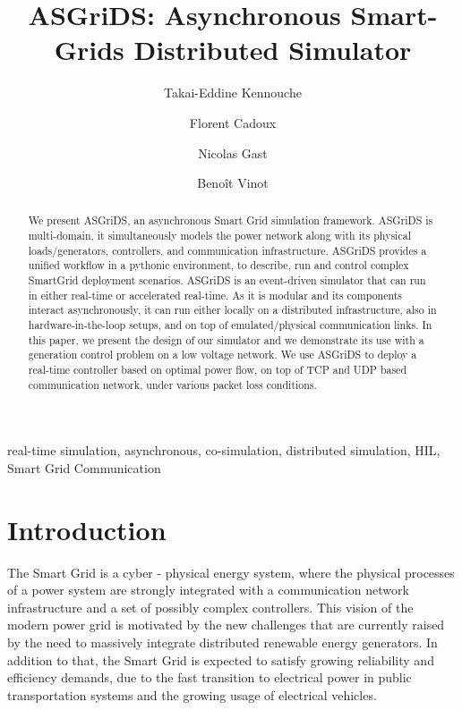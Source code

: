 \documentclass[conference]{IEEEtran}
\begin{document}
\title{ASGriDS: Asynchronous Smart-Grids Distributed Simulator}


\author[1]{Takai-Eddine Kennouche}
\author[2]{Florent Cadoux}
\author[1]{Nicolas Gast}
\author[3]{Beno\^{i}t Vinot}


\maketitle
\begin{abstract}
We present ASGriDS, an asynchronous Smart Grid simulation framework. ASGriDS is multi-domain, it simultaneously models the power network along with its physical loads/generators, controllers, and communication infrastructure. ASGriDS provides a unified workflow in a pythonic environment, to describe, run and control complex SmartGrid deployment scenarios. ASGriDS is an event-driven simulator that can run in either real-time or accelerated real-time. As it is modular and its components interact asynchronously, it can run either locally on a distributed infrastructure, also in hardware-in-the-loop setups, and on top of emulated/physical communication links.
In this paper, we present the design of our simulator and we demonstrate its use with a generation control problem on a low voltage network. We use ASGriDS to deploy a real-time controller based on optimal power flow, on top of TCP and UDP based communication network, under various packet loss conditions.
\end{abstract}

\begin{IEEEkeywords}
real-time simulation, asynchronous, co-simulation, distributed simulation, HIL, Smart Grid Communication
\end{IEEEkeywords}

\section{Introduction}
The Smart Grid is a cyber - physical energy system, where the physical processes of a power system are strongly integrated with a communication network infrastructure and a set of possibly complex controllers. This vision of the modern power grid is motivated by the new challenges that are currently raised by the need to massively integrate distributed renewable energy generators. In addition to that, the Smart Grid is expected to satisfy growing reliability and efficiency demands, due to the fast transition to electrical power in public transportation systems and the growing usage of electrical vehicles. 
\end{document}
